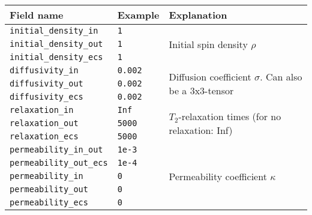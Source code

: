 \begin{tabular}{|l|l|p{8cm}|} \hline
    Field name              & Example                 & Explanation                                                               \\ \hline

    \verb+initial_density_in+  & \verb+1+  & \multirow{3}{*}{Initial spin density $\rho$}                              \\ \cline{1-2}
    \verb+initial_density_out+  & \verb+1+  &                                                                           \\ \cline{1-2}
    \verb+initial_density_ecs+  & \verb+1+  &                                                                           \\ \hline

    \verb+diffusivity_in+  & \verb+0.002+  & \multirow{3}{*}{Diffusion coefficient $\sigma$. Can also be a 3x3-tensor} \\ \cline{1-2}
    \verb+diffusivity_out+  & \verb+0.002+ &                                                                           \\ \cline{1-2}
    \verb+diffusivity_ecs+ & \verb+0.002+ &                                                                           \\ \hline

    \verb+relaxation_in+ & \verb+Inf+ & \multirow{3}{*}{$T_2$-relaxation times (for no relaxation: Inf)}          \\ \cline{1-2}
    \verb+relaxation_out+ & \verb+5000+ &                                                                           \\ \cline{1-2}
    \verb+relaxation_ecs+ & \verb+5000+ &                                                                           \\ \hline

    \verb+permeability_in_out+ & \verb+1e-3+ & \multirow{5}{*}{Permeability coefficient $\kappa$}                        \\ \cline{1-2}
    \verb+permeability_out_ecs+ & \verb+1e-4+ &                                                                           \\ \cline{1-2}
    \verb+permeability_in+ & \verb+0+ &                                                                           \\ \cline{1-2}
    \verb+permeability_out+ & \verb+0+ &                                                                           \\ \cline{1-2}
    \verb+permeability_ecs+ & \verb+0+ &                                                                           \\ \hline
\end{tabular}
